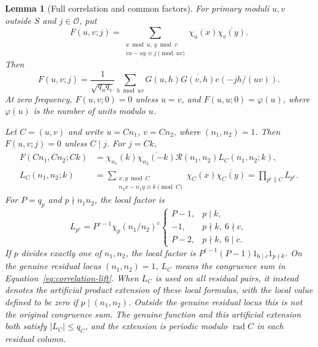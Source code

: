 \documentclass[11pt,a4paper]{article}
\numberwithin{equation}{section}
\numberwithin{figure}{section}
\newtheorem{lemma}[theorem]{Lemma}
\theoremstyle{definition}
\theoremstyle{remark}
\begin{document}
\begin{lemma}[Full correlation and common factors]\label{lem:full-correlation}
For primary moduli $u,v$ outside $S$ and $j\in\mathcal O$, put
\begin{equation}
 F(u,v;j)
 =\sum_{\substack{x\bmod u,\ y\bmod v\\
                    vx-uy\equiv j\pmod{uv}}}
       \chi_u(x)\overline{\chi_v(y)}.
 \label{old-eq:2.11}
\end{equation}
Then
\[
 F(u,v;j)=\frac1{\sqrt{q_uq_v}}\sum_{h\bmod uv}
 G(u,h)\overline{G(v,h)}e(-jh/(uv)).
\]
At zero frequency, $F(u,v;0)=0$ unless $u=v$, and
$F(u,u;0)=\varphi(u)$, where $\varphi(u)$ is the number of units modulo $u$.

Let $C=(u,v)$ and write $u=Cn_1$, $v=Cn_2$, where $(n_1,n_2)=1$.
Then $F(u,v;j)=0$ unless $C\mid j$.  For $j=Ck$,
\begin{equation}
 \begin{aligned}
 F(Cn_1,Cn_2;Ck)
 &=\chi_{n_1}(k)\overline{\chi_{n_2}(-k)}
      \mathcal R(n_1,n_2)L_C(n_1,n_2;k),\\
 L_C(n_1,n_2;k)
 &=\sum_{\substack{x,y\bmod C\\n_2x-n_1y\equiv k\pmod C}}
       \chi_C(x)\overline{\chi_C(y)}
   =\prod_{p^c\parallel C}L_{p^c}.
 \end{aligned}
 \label{eq:correlation-lift}
\end{equation}
For $P=q_p$ and $p\nmid n_1n_2$, the local factor is
\begin{equation}
 L_{p^c}=P^{c-1}\chi_p(n_1/n_2)^c
 \begin{cases}
 P-1,&p\mid k,\\
 -1,&p\nmid k,\ 6\nmid c,\\
 P-2,&p\nmid k,\ 6\mid c.
 \end{cases}
 \label{eq:correlation-local}
\end{equation}
If $p$ divides exactly one of $n_1,n_2$, the local factor is
$P^{c-1}(P-1)1_{6\mid c}1_{p\nmid k}$.  On the genuine residual locus
$(n_1,n_2)=1$, $L_C$ means the congruence sum in
Equation~\eqref{eq:correlation-lift}.  When $L_C$ is used on all residual
pairs, it instead denotes the artificial product extension of these local
formulas, with the local value defined to be zero if $p\mid(n_1,n_2)$.
Outside the genuine residual locus this is not the original congruence sum.
The genuine function and this artificial extension both satisfy
$|L_C|\le q_C$, and the extension is periodic modulo
$\operatorname{rad}C$ in each residual column.
\end{lemma}
\end{document}
